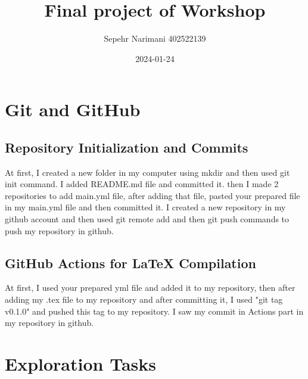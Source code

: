 \documentclass[titlepage]{article}
\title{Final project of Workshop}
\author{Sepehr Narimani 402522139}
\date{2024-01-24}
\begin{document}
	\maketitle
	\pagestyle{fancy}
	\fancyhead[L]{}
	\section{Git and GitHub}
	\subsection{Repository Initialization and Commits}
	At first, I created a new folder in my computer using mkdir and then used git init command. I added README.md file and committed it. then I made 2 repositories to  add main.yml file, after adding that file, pasted your prepared file in my main.yml file and then committed it. I created a new repository in my github account and then used git remote add and then git push commands to push my repository in github.
	\subsection{ GitHub Actions for LaTeX Compilation}
	At first, I used your prepared yml file and added it to my repository, then after adding my .tex file to my repository and after committing it, I used "git tag v0.1.0" and pushed this tag to my repository. I saw my commit in Actions part in my repository in github.
	\section{Exploration Tasks}
\end{document}
